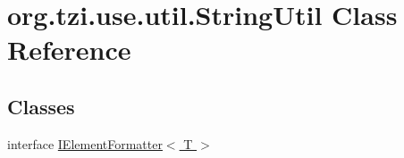 \hypertarget{classorg_1_1tzi_1_1use_1_1util_1_1_string_util}{\section{org.\-tzi.\-use.\-util.\-String\-Util Class Reference}
\label{classorg_1_1tzi_1_1use_1_1util_1_1_string_util}
}
\subsection*{Classes}
\begin{DoxyCompactItemize}
\item 
interface \hyperlink{interfaceorg_1_1tzi_1_1use_1_1util_1_1_string_util_1_1_i_element_formatter_3_01_t_01_4}{I\-Element\-Formatter$<$ T $>$}
\end{DoxyCompactItemize}
